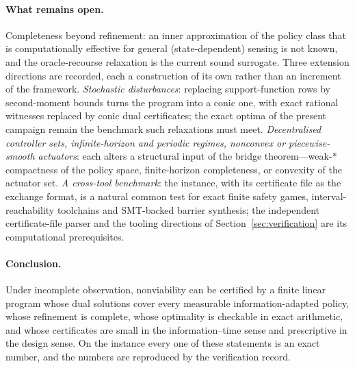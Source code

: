 \paragraph{What remains open.}
Completeness beyond refinement: an inner approximation of the policy class that is computationally effective for general (state-dependent) sensing is not known, and the oracle-recourse relaxation is the current sound surrogate. Three extension directions are recorded, each a construction of its own rather than an increment of the framework. \emph{Stochastic disturbances}: replacing support-function rows by second-moment bounds turns the program into a conic one, with exact rational witnesses replaced by conic dual certificates; the exact optima of the present campaign remain the benchmark such relaxations must meet. \emph{Decentralised controller sets, infinite-horizon and periodic regimes, nonconvex or piecewise-smooth actuators}: each alters a structural input of the bridge theorem---weak-$\ast$ compactness of the policy space, finite-horizon completeness, or convexity of the actuator set. \emph{A cross-tool benchmark}: the instance, with its certificate file as the exchange format, is a natural common test for exact finite safety games, interval-reachability toolchains and SMT-backed barrier synthesis; the independent certificate-file parser and the tooling directions of Section~\ref{sec:verification} are its computational prerequisites.

\paragraph{Conclusion.}
Under incomplete observation, nonviability can be certified by a finite linear program whose dual solutions cover every measurable information-adapted policy, whose refinement is complete, whose optimality is checkable in exact arithmetic, and whose certificates are small in the information--time sense and prescriptive in the design sense. On the instance every one of these statements is an exact number, and the numbers are reproduced by the verification record.
